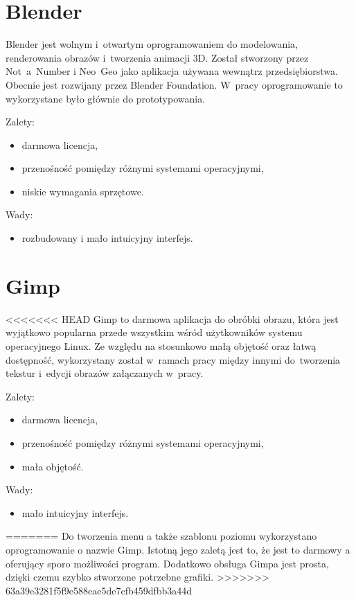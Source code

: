 \section{Blender}
Blender jest wolnym i~otwartym oprogramowaniem do modelowania, renderowania obrazów i~tworzenia animacji 3D. Został stworzony przez Not~a~Number i Neo~Geo jako aplikacja używana wewnątrz przedsiębiorstwa. Obecnie jest rozwijany przez Blender Foundation. W~pracy oprogramowanie to wykorzystane było głównie do prototypowania.

{\raggedright
Zalety:
\begin{itemize}
\item darmowa licencja,
\item przenośność pomiędzy różnymi systemami operacyjnymi,
\item niskie wymagania sprzętowe.
\end{itemize}

Wady:
\begin{itemize}
\item rozbudowany i mało intuicyjny interfejs.
\end{itemize}
}

\section{Gimp}

<<<<<<< HEAD
Gimp to darmowa aplikacja do obróbki obrazu, która jest wyjątkowo popularna przede wszystkim wśród użytkowników systemu operacyjnego Linux. Ze względu na stosunkowo małą objętość oraz łatwą dostępność, wykorzystany został w~ramach pracy między innymi do~tworzenia tekstur i~edycji obrazów załączanych w~pracy.

{\raggedright
Zalety:
\begin{itemize}
\item darmowa licencja,
\item przenośność pomiędzy różnymi systemami operacyjnymi,
\item mała objętość.
\end{itemize}

Wady:
\begin{itemize}
\item mało intuicyjny interfejs.
\end{itemize}
}
=======
Do tworzenia menu a także szablonu poziomu wykorzystano oprogramowanie o nazwie Gimp. Istotną jego zaletą jest to, że jest to darmowy a oferujący sporo możliwości program. Dodatkowo obsługa Gimpa jest prosta, dzięki czemu szybko stworzone potrzebne grafiki.
>>>>>>> 63a39e3281f5f9e588eae5de7cfb459dfbb3a44d


